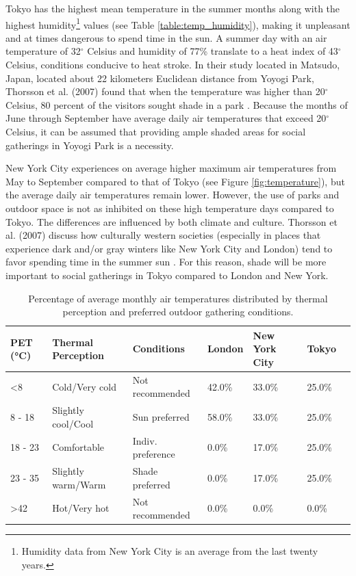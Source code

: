 \begin{multicols}{2}
Tokyo has the highest mean temperature in the summer months along with the highest humidity\footnote{Humidity data from New York City is an average from the last twenty years.} values (see Table \ref{table:temp_humidity}), making it unpleasant and at times dangerous to spend time in the sun. A summer day with an air temperature of 32$^{\circ}$ Celsius and humidity of 77\% translate to a heat index of 43$^{\circ}$ Celsius, conditions conducive to heat stroke. In their study located in Matsudo, Japan, located about 22 kilometers Euclidean distance from Yoyogi Park, Thorsson et al. (2007) found that when the temperature was higher than 20$^{\circ}$ Celsius, 80 percent of the visitors sought shade in a park \cite{thorsson_thermal_2007}. Because the months of June through September have average daily air temperatures that exceed 20$^{\circ}$ Celsius, it can be assumed that providing ample shaded areas for social gatherings in Yoyogi Park is a necessity. 

New York City experiences on average higher maximum air temperatures from May to September compared to that of Tokyo (see Figure \ref{fig:temperature}), but the average daily air temperatures remain lower. However, the use of parks and outdoor space is not as inhibited on these high temperature days compared to Tokyo. The differences are influenced by both climate and culture. Thorsson et al. (2007) discuss how culturally western societies (especially in places that experience dark and/or gray winters like New York City and London) tend to favor spending time in the summer sun \cite{thorsson_thermal_2007}. For this reason, shade will be more important to social gatherings in Tokyo compared to London and New York. 

\end{multicols}

\begin{table}[h]
  \centering
\small
\begin{tabular}{lllllll}
\toprule
PET (°C) & Thermal Perception  &    Conditions &  London & New York City & Tokyo &  \\
\midrule
<8 &      Cold/Very cold  &    Not recommended &       42.0\% &    33.0\% &      25.0\%  \\
8 - 18 &  Slightly cool/Cool  &      Sun preferred &       58.0\% &    33.0\% &      25.0\% \\
18 - 23 &         Comfortable  &  Indiv. preference  &        0.0\% &    17.0\% &      25.0\%\\
23 - 35 &  Slightly warm/Warm  &    Shade preferred &        0.0\% &    17.0\% &      25.0\%\\
>42  &        Hot/Very hot  &    Not recommended  &        0.0\% &     0.0\% &       0.0\%\\
\bottomrule
\end{tabular}
\caption[Thermal perception by city]{Percentage of average monthly air temperatures distributed by thermal perception and preferred outdoor gathering conditions.}
\label{table:yearly_percent}
\end{table}

